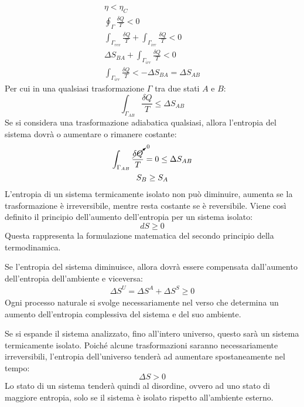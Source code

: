 \documentclass{article}
\numberwithin{equation}{subsection}
\begin{document}
\begin{gather*}
    \eta<\eta_C\\
    \oint_{\Gamma}\displaystyle\frac{\delta Q}{T}<0\\
    \int_{\Gamma_{{rev}}}\displaystyle\frac{\delta Q}{T}+\int_{\Gamma_{{irr}}}\frac{\delta Q}{T}<0\\
    \Delta S_{BA}+\displaystyle\int_{\Gamma_{{irr}}}\frac{\delta Q}{T}<0\\
    \displaystyle\int_{\Gamma_{{irr}}}\frac{\delta Q}{T}<-\Delta S_{BA}=\Delta S_{AB}
\end{gather*}
Per cui in una qualsiasi trasformazione $\Gamma$ tra due stati $A$ e $B$:
\begin{equation*}
    \displaystyle\int_{\Gamma_{AB}}\frac{\delta Q}{T}\leq\Delta S_{AB}
\end{equation*}
Se si considera una trasformazione adiabatica qualsiasi, allora l'entropia del sistema dovrà o aumentare o rimanere costante:
\begin{gather*}
    \displaystyle\int_{\Gamma_{AB}}\frac{\cancelto{0}{\delta Q}}{T}=0\leq\Delta S_{AB}\\
    S_B\geq S_A
\end{gather*}
L'entropia di un sistema termicamente isolato non può diminuire, aumenta se la trasformazione è irreversibile, mentre resta costante se è reversibile. Viene così definito 
il principio dell'aumento dell'entropia per un sistema isolato: 
\begin{equation*}
    dS\geq0
\end{equation*}
Questa rappresenta la formulazione matematica del secondo principio della termodinamica. 



Se l'entropia del sistema diminuisce, allora dovrà essere compensata dall'aumento dell'entropia dell'ambiente e viceversa:
\begin{gather*}
    \Delta S^U=\Delta  S^A+\Delta S^S\geq0
\end{gather*}
Ogni processo naturale si svolge necessariamente nel verso che determina un aumento dell'entropia complessiva del sistema e del suo ambiente. 



Se si espande il sistema analizzato, fino all'intero universo, questo sarà un sistema termicamente isolato. Poiché alcune trasformazioni saranno necessariamente irreversibili, 
l'entropia dell'universo tenderà ad aumentare spostaneamente nel tempo:
\begin{equation}
    \Delta S>0
\end{equation}
Lo stato di un sistema tenderà quindi al disordine, ovvero ad uno stato di maggiore entropia, solo se il sistema è isolato rispetto all'ambiente esterno. 
\end{document}
